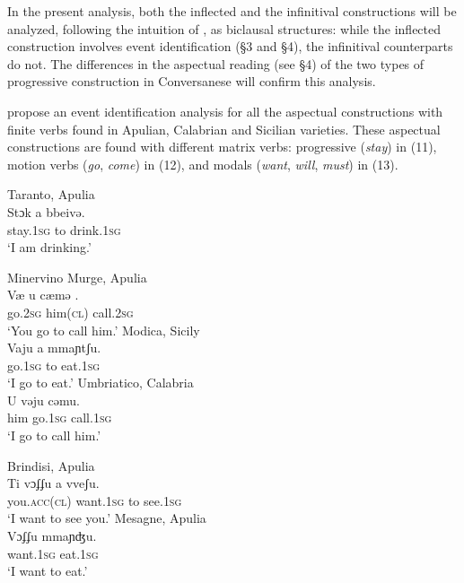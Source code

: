 \documentclass[output=paper]{langsci/langscibook}
\begin{document}
In the present analysis, both the inflected and the infinitival constructions will be analyzed, following the intuition of \citet[1:688]{Manzini2005}, as biclausal structures: while the inflected construction involves event identification (§3 and §4), the infinitival counterparts do not. The differences in the aspectual reading (see §4) of the two types of progressive construction in Conversanese will confirm this analysis.

\citet[I:688--689]{Manzini2005} propose an event identification analysis for all the aspectual constructions with finite verbs found in Apulian, Calabrian and Sicilian varieties. These aspectual constructions are found with different matrix verbs: progressive (\textit{stay}) in (11), motion verbs (\textit{go}, \textit{come}) in (12), and modals (\textit{want}, \textit{will}, \textit{must}) in (13).

\ea%
         Taranto, Apulia\label{ex:lorusso:11}\\
    \gll Stɔk    a  bbeivə.     \\
         stay.\textsc{1sg}  to  drink.\textsc{1sg}    \\
    \glt ‘I am drinking.’
\z


\ea%
    \label{ex:lorusso:12}
    \ea  Minervino Murge, Apulia\\
    \gll Væ    u    cæmə .\\
         go.\textsc{2sg}  him(\textsc{cl})   call.\textsc{2sg}    \\
    \glt ‘You go to call him.’
    \ex  Modica, Sicily\\
    \gll Vaju    a  mmaɲtʃu.       \\
         go.\textsc{1sg} to  eat.\textsc{1sg}\\
    \glt ‘I go to eat.’     
    \ex  Umbriatico, Calabria\\
    \gll U    vəju    cəmu.\\
         him  go.\textsc{1sg}  call.\textsc{1sg}\\
    \glt ‘I go to call him.’
    \z
\z

\ea%
    \label{ex:lorusso:13}
    \ea  Brindisi, Apulia\\
    \gll Ti      vɔʄʄu    a  vveʃu.    \\
         you\textsc{.acc(cl)} want.\textsc{1sg}  to  see.\textsc{1sg}\\
    \glt ‘I want to see you.’
    \ex  Mesagne, Apulia\\
    \gll Vɔʄʄu    mmaɲʤu.          \\
         want.\textsc{1sg}   eat.\textsc{1sg}\\
    \glt ‘I want to eat.’
\z
\z
\end{document}
